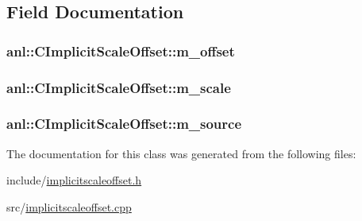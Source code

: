 \subsection{Field Documentation}
\hypertarget{classanl_1_1CImplicitScaleOffset_ad003f12ab51436f9e59a8c52061f6a5a}{
\subsubsection[{m\_\-offset}]{ {\bf anl::CImplicitScaleOffset::m\_\-offset}}}
\label{classanl_1_1CImplicitScaleOffset_ad003f12ab51436f9e59a8c52061f6a5a}
\hypertarget{classanl_1_1CImplicitScaleOffset_a5317178b9bd28f77f46ffd24454cadf9}{
\subsubsection[{m\_\-scale}]{ {\bf anl::CImplicitScaleOffset::m\_\-scale}}}
\label{classanl_1_1CImplicitScaleOffset_a5317178b9bd28f77f46ffd24454cadf9}
\hypertarget{classanl_1_1CImplicitScaleOffset_ab388ab71edb0c8f86b5612df76aca7e4}{
\subsubsection[{m\_\-source}]{ {\bf anl::CImplicitScaleOffset::m\_\-source}}}
\label{classanl_1_1CImplicitScaleOffset_ab388ab71edb0c8f86b5612df76aca7e4}


The documentation for this class was generated from the following files:\begin{DoxyCompactItemize}
\item 
include/\hyperlink{implicitscaleoffset_8h}{implicitscaleoffset.h}\item 
src/\hyperlink{implicitscaleoffset_8cpp}{implicitscaleoffset.cpp}\end{DoxyCompactItemize}
